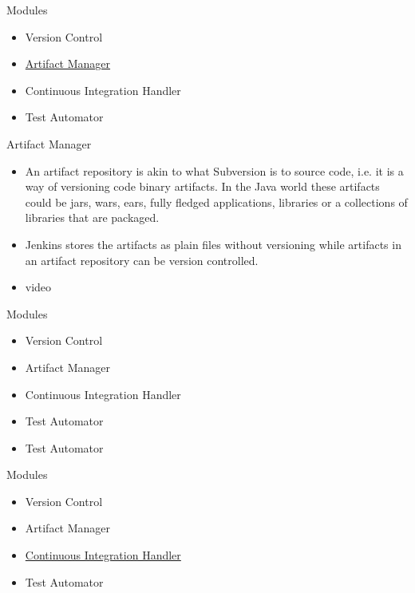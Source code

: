 \documentclass{beamer}
\begin{document}
\begin{frame}{Modules}
\begin{itemize}
\item Version Control
\item \underline{Artifact Manager}
\item Continuous Integration Handler
\item Test Automator

\end{itemize}

\end{frame}

\begin{frame}{Artifact Manager}
\begin{itemize}
\item An artifact repository is akin to what Subversion is to source code, i.e. it is a way of versioning code binary artifacts. In the Java world these artifacts could be jars, wars, ears, fully fledged applications, libraries or a collections of libraries that are packaged.
\vspace{0.5 cm}
\item Jenkins stores the artifacts as plain files without versioning while artifacts in an artifact repository can be version controlled.
\vspace{0.5 cm}
\item video
\end{itemize}
\end{frame}


\begin{frame}{Modules}
\begin{itemize}
\item Version Control
\item Artifact Manager
\item Continuous Integration Handler
\item Test Automator
\item Test Automator
\end{itemize}

\end{frame}

\begin{frame}{Modules}
\begin{itemize}
\item Version Control
\item Artifact Manager
\item \underline{Continuous Integration Handler}
\item Test Automator

\end{itemize}

\end{frame}
\end{document}
